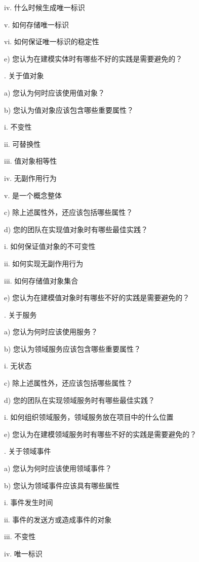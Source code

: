 \documentclass[macfonts,master,oneside]{njuthesis}
\begin{document}
\noindent
iv.	什么时候生成唯一标识

\noindent
v.	如何存储唯一标识

\noindent
vi.	如何保证唯一标识的稳定性

\noindent
e)	您认为在建模实体时有哪些不好的实践是需要避免的？

.	关于值对象

\noindent
a)	您认为何时应该使用值对象？

\noindent
b)	您认为值对象应该包含哪些重要属性？

\noindent
i.	不变性

\noindent
ii.	可替换性

\noindent
iii.	值对象相等性

\noindent
iv.	无副作用行为

\noindent
v.	是一个概念整体

\noindent
c)	除上述属性外，还应该包括哪些属性？

\noindent
d)	您的团队在实现值对象时有哪些最佳实践？

\noindent
i.	如何保证值对象的不可变性

\noindent
ii.	如何实现无副作用行为

\noindent
iii.	如何存储值对象集合

\noindent
e)	您认为在建模值对象时有哪些不好的实践是需要避免的？

.	关于服务

\noindent
a)	您认为何时应该使用服务？

\noindent
b)	您认为领域服务应该包含哪些重要属性？

\noindent
i.	无状态

\noindent
c)	除上述属性外，还应该包括哪些属性？

\noindent
d)	您的团队在实现领域服务时有哪些最佳实践？

\noindent
i.	如何组织领域服务，领域服务放在项目中的什么位置

\noindent
e)	您认为在建模领域服务时有哪些不好的实践是需要避免的？

.	关于领域事件

\noindent
a)	您认为何时应该使用领域事件？

\noindent
b)	您认为领域事件应该具有哪些属性

\noindent
i.	事件发生时间

\noindent
ii.	事件的发送方或造成事件的对象

\noindent
iii.	不变性

\noindent
iv.	唯一标识
\end{document}
